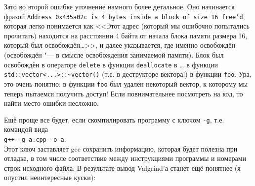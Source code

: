\documentclass[a4paper,10pt]{problems}
\begin{document}
Зато во второй ошибке уточнение намного более детальное. Оно начинается фразой \texttt{Address 0x435a02c is 4 bytes inside a block of size 16 free'd},
которая легко понимается как <<Этот адрес (который мы ошибочно попытались прочитать) находится на расстоянии 4 байта от начала блока памяти размера 16,
который был освобождён\dots>>, и далее указывается, где именно освобождён (освобождён "--- в смысле освобождения занимаемой памяти). 
Блок был освобождён в операторе \verb`delete` в функции \verb`deallocate` в \dots{} в функции \verb`std::vector<...>::~vector()` (т.е. в деструкторе вектора!)
в функции \verb`foo`. 
Ура, это очень понятно: в функции \verb`foo` был удалён некоторый вектор, к которому мы теперь пытаемся получить доступ! 
Если повнимательнее посмотреть на код, то найти место ошибки несложно.

Ещё проще все будет, если скомпилировать программу с ключом \verb`-g`, т.е. командой вида\\
\verb`g++ -g a.cpp -o a`. \\
Этот ключ заставляет gcc сохранить информацию, которая будет полезна при отладке, в том числе соответствие между инструкциями программы
и номерами строк исходного файла. В результате вывод Valgrind'а станет ещё понятнее (я опустил неинтересные куски):
\end{document}
